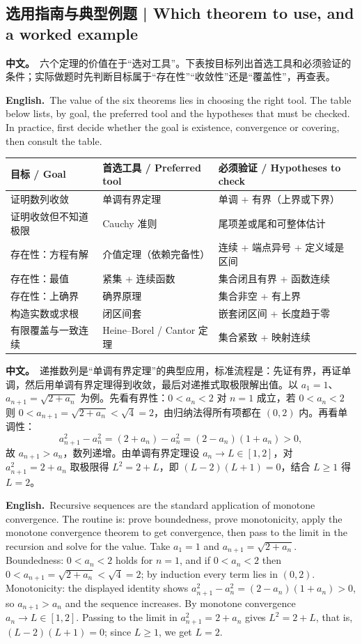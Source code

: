 \documentclass[UTF8,11pt,a4paper]{ctexart}
\newcommand{\BOTH}[2]{\par\noindent\textbf{中文。}\ #1\par\noindent\textbf{English.}\ #2\par}
\begin{document}
\subsection{选用指南与典型例题 | Which theorem to use, and a worked example}
\BOTH{六个定理的价值在于“选对工具”。下表按目标列出首选工具和必须验证的条件；实际做题时先判断目标属于“存在性”“收敛性”还是“覆盖性”，再查表。}{The value of the six theorems lies in choosing the right tool. The table below lists, by goal, the preferred tool and the hypotheses that must be checked. In practice, first decide whether the goal is existence, convergence or covering, then consult the table.}
\begin{center}\small
\begin{tabular}{@{}p{3.2cm}p{4.0cm}p{8.4cm}@{}}
\toprule
\textbf{目标 / Goal} & \textbf{首选工具 / Preferred tool} & \textbf{必须验证 / Hypotheses to check}\\
\midrule
证明数列收敛 & 单调有界定理 & 单调 + 有界（上界或下界）\\
证明收敛但不知道极限 & Cauchy 准则 & 尾项差或尾和可整体估计\\
存在性：方程有解 & 介值定理（依赖完备性） & 连续 + 端点异号 + 定义域是区间\\
存在性：最值 & 紧集 + 连续函数 & 集合闭且有界 + 函数连续\\
存在性：上确界 & 确界原理 & 集合非空 + 有上界\\
构造实数或求根 & 闭区间套 & 嵌套闭区间 + 长度趋于零\\
有限覆盖与一致连续 & Heine--Borel / Cantor 定理 & 集合紧致 + 映射连续\\
\bottomrule
\end{tabular}
\end{center}
\BOTH{递推数列是“单调有界定理”的典型应用，标准流程是：先证有界，再证单调，然后用单调有界定理得到收敛，最后对递推式取极限解出值。以 $a_1=1$、$a_{n+1}=\sqrt{2+a_n}$ 为例。先看有界性：$0<a_n<2$ 对 $n=1$ 成立，若 $0<a_n<2$ 则 $0<a_{n+1}=\sqrt{2+a_n}<\sqrt4=2$，由归纳法得所有项都在 $(0,2)$ 内。再看单调性：
\[
a_{n+1}^2-a_n^2=(2+a_n)-a_n^2=(2-a_n)(1+a_n)>0,
\]
故 $a_{n+1}>a_n$，数列递增。由单调有界定理设 $a_n\to L\in[1,2]$，对 $a_{n+1}^2=2+a_n$ 取极限得 $L^2=2+L$，即 $(L-2)(L+1)=0$，结合 $L\ge1$ 得 $L=2$。}{Recursive sequences are the standard application of monotone convergence. The routine is: prove boundedness, prove monotonicity, apply the monotone convergence theorem to get convergence, then pass to the limit in the recursion and solve for the value. Take $a_1=1$ and $a_{n+1}=\sqrt{2+a_n}$. Boundedness: $0<a_n<2$ holds for $n=1$, and if $0<a_n<2$ then $0<a_{n+1}=\sqrt{2+a_n}<\sqrt4=2$; by induction every term lies in $(0,2)$. Monotonicity: the displayed identity shows $a_{n+1}^2-a_n^2=(2-a_n)(1+a_n)>0$, so $a_{n+1}>a_n$ and the sequence increases. By monotone convergence $a_n\to L\in[1,2]$. Passing to the limit in $a_{n+1}^2=2+a_n$ gives $L^2=2+L$, that is, $(L-2)(L+1)=0$; since $L\ge1$, we get $L=2$.}
\end{document}
